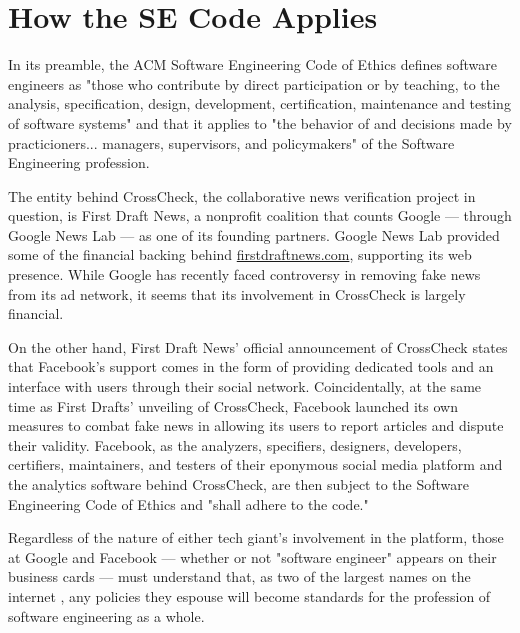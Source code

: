 
\section{How the SE Code Applies}

\par In its preamble, the ACM Software Engineering Code of Ethics defines software engineers as "those who contribute by direct participation or by teaching, to the analysis, specification, design, development, certification, maintenance and testing of software systems" and that it applies to "the behavior of and decisions made by practicioners... managers, supervisors, and policymakers" of the Software Engineering profession. \cite{se_code}

\par The entity behind CrossCheck, the collaborative news verification project in question, is First Draft News, a nonprofit coalition that counts Google --- through Google News Lab --- as one of its founding partners. Google News Lab provided some of the financial backing behind \url{firstdraftnews.com}, supporting its web presence. \cite{firstdraftnews_about} While Google has recently faced controversy in removing fake news from its ad network, \cite{tc_google_took_down_ads} it seems that its involvement in CrossCheck is largely financial.

\par On the other hand, First Draft News' official announcement of CrossCheck states that Facebook's support comes in the form of providing dedicated tools and an interface with users through their social network. \cite{crosscheck_launch} Coincidentally, at the same time as First Drafts' unveiling of CrossCheck, Facebook launched its own measures to combat fake news in allowing its users to report articles and dispute their validity. \cite{tc_google_fb_partner} Facebook, as the analyzers, specifiers, designers, developers, certifiers, maintainers, and testers of their eponymous social media platform and the analytics software behind CrossCheck, are then subject to the Software Engineering Code of Ethics and "shall adhere to the code." \cite{se_code}

\par Regardless of the nature of either tech giant's involvement in the platform, those at Google and Facebook --- whether or not "software engineer" appears on their business cards --- must understand that, as two of the largest names on the internet , any policies they espouse will become standards for the profession of software engineering as a whole.